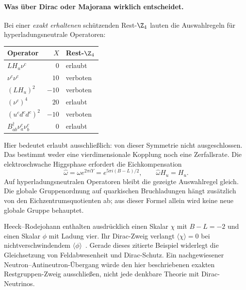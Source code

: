 \paragraph{Was über Dirac oder Majorana wirklich entscheidet.}
Bei einer \emph{exakt erhaltenen} schützenden Rest-$\Z_4$ lauten die Auswahlregeln für hyperladungsneutrale Operatoren:
\begin{center}
\begin{tabular}{lrl}
\toprule Operator & $X$ & Rest-$\Z_4$\\\midrule
$L H_u\nu^c$ & $0$ & erlaubt\\
$\nu^c\nu^c$ & $10$ & verboten\\
$(L H_u)^2$ & $-10$ & verboten\\
$(\nu^c)^4$ & $20$ & erlaubt\\
$(u^cd^cd^c)^2$ & $-10$ & verboten\\
$B^\dagger_{ab}\nu^c_a\nu^c_b$ & $0$ & erlaubt\\\bottomrule
\end{tabular}
\end{center}
Hier bedeutet erlaubt ausschließlich: von dieser Symmetrie nicht ausgeschlossen. Das bestimmt weder eine vierdimensionale Kopplung noch eine Zerfallsrate. Die elektroschwache Higgsphase erfordert die Eichkompensation
\begin{equation}
\widehat\omega=\omega e^{2\pi iY}
=e^{5\pi i(B-L)/2},\qquad \widehat\omega H_u=H_u.
\end{equation}
Auf hyperladungsneutralen Operatoren bleibt die gezeigte Auswahlregel gleich. Die globale Gruppenordnung auf quarkischen Bruchladungen hängt zusätzlich von den Eichzentrumsquotienten ab; aus dieser Formel allein wird keine neue globale Gruppe behauptet.

Heeck--Rodejohann enthalten ausdrücklich einen Skalar $\chi$ mit $B-L=-2$ und einen Skalar $\phi$ mit Ladung vier. Ihr Dirac-Zweig verlangt $\langle\chi\rangle=0$ bei nichtverschwindendem $\langle\phi\rangle$~\cite{heeckquadruple}. Gerade dieses zitierte Beispiel widerlegt die Gleichsetzung von Feldabwesenheit und Dirac-Schutz. Ein nachgewiesener Neutron--Antineutron-Übergang würde den hier beschriebenen exakten Restgruppen-Zweig ausschließen, nicht jede denkbare Theorie mit Dirac-Neutrinos.

